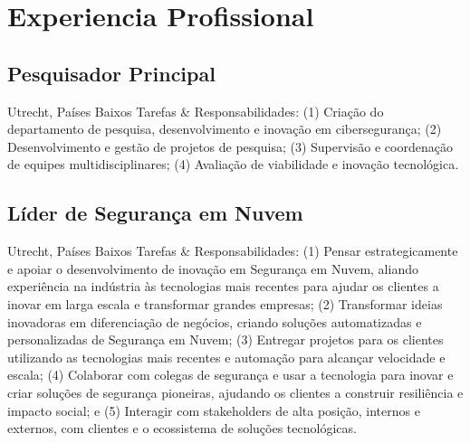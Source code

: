 \documentclass[print]{styles/friggeri-cv-mac} %
\begin{document}
\section{Experiencia Profissional}\vspace{-5pt}


\subsection{Pesquisador Principal}\vspace{-5pt}
\begin{entrylist}
	{Utrecht, Países Baixos}
	{Tarefas \& Responsabilidades: (1) Criação do departamento de pesquisa, desenvolvimento e inovação em cibersegurança; (2) Desenvolvimento e gestão de projetos de pesquisa; (3) Supervisão e coordenação de equipes multidisciplinares; (4) Avaliação de viabilidade e inovação tecnológica.}
\end{entrylist}

\subsection{Líder de Segurança em Nuvem}\vspace{-5pt}
\begin{entrylist}
	{Utrecht, Países Baixos}
	{Tarefas \& Responsabilidades: (1) Pensar estrategicamente e apoiar o desenvolvimento de inovação em Segurança em Nuvem, aliando experiência na indústria às tecnologias mais recentes para ajudar os clientes a inovar em larga escala e transformar grandes empresas; (2) Transformar ideias inovadoras em diferenciação de negócios, criando soluções automatizadas e personalizadas de Segurança em Nuvem; (3) Entregar projetos para os clientes utilizando as tecnologias mais recentes e automação para alcançar velocidade e escala; (4) Colaborar com colegas de segurança e usar a tecnologia para inovar e criar soluções de segurança pioneiras, ajudando os clientes a construir resiliência e impacto social; e (5) Interagir com stakeholders de alta posição, internos e externos, com clientes e o ecossistema de soluções tecnológicas.}
\end{entrylist}
\end{document}

